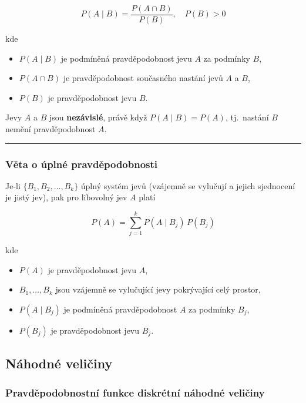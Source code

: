\documentclass[a4paper, 11pt]{article}
\begin{document}
\begin{equation*}
	P(A \mid B) = \frac{P(A \cap B)}{P(B)}, \quad P(B) > 0
\end{equation*}

kde

\begin{itemize}[noitemsep]
	\item $P(A \mid B)$ je podmíněná pravděpodobnost jevu $A$ za podmínky $B$,
	\item $P(A \cap B)$ je pravděpodobnost současného nastání jevů $A$ a $B$,
	\item $P(B)$ je pravděpodobnost jevu $B$.
\end{itemize}

Jevy $A$ a $B$ jsou \textbf{nezávislé}, právě když $P(A \mid B) = P(A)$,
tj.\ nastání $B$ nemění pravděpodobnost $A$.

\noindent\hrule\medskip

\subsubsection{Věta o úplné pravděpodobnosti}

Je-li $\{B_1, B_2, \ldots, B_k\}$ úplný systém jevů (vzájemně se vylučují
a jejich sjednocení je jistý jev), pak pro libovolný jev $A$ platí

\begin{equation*}
	P(A) = \sum_{j=1}^{k} P(A \mid B_j)\,P(B_j)
\end{equation*}

kde

\begin{itemize}[noitemsep]
	\item $P(A)$ je pravděpodobnost jevu $A$,
	\item $B_1, \ldots, B_k$ jsou vzájemně se vylučující jevy pokrývající celý prostor,
	\item $P(A \mid B_j)$ je podmíněná pravděpodobnost $A$ za podmínky $B_j$,
	\item $P(B_j)$ je pravděpodobnost jevu $B_j$.
\end{itemize}

\subsection{Náhodné veličiny}

\subsubsection{Pravděpodobnostní funkce diskrétní náhodné veličiny}
\end{document}
